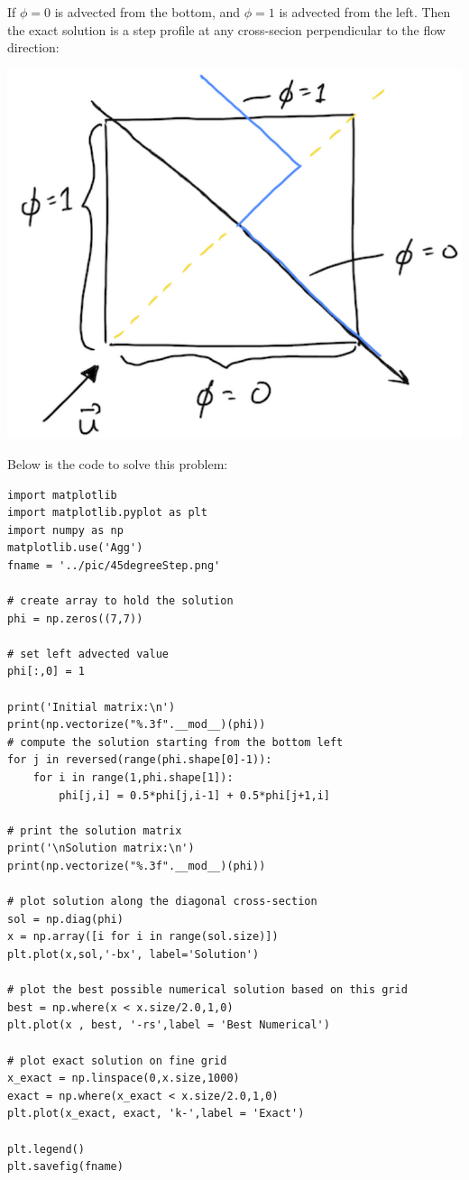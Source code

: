 \documentclass[11pt]{article}
\begin{document}
If \(\phi = 0\) is advected from the bottom, and \(\phi = 1\) is advected from the left. Then the exact
solution is a step profile at any cross-secion perpendicular to the flow direction:
\begin{center}
\includegraphics[scale=0.4]{../pic/stepProfile.png}
\end{center}

Below is the code to solve this problem:
\lstset{language=Python,label= ,caption= ,captionpos=b,numbers=none,style=mystyle}
\begin{lstlisting}
import matplotlib
import matplotlib.pyplot as plt
import numpy as np
matplotlib.use('Agg')
fname = '../pic/45degreeStep.png'

# create array to hold the solution
phi = np.zeros((7,7))

# set left advected value
phi[:,0] = 1

print('Initial matrix:\n')
print(np.vectorize("%.3f".__mod__)(phi))
# compute the solution starting from the bottom left
for j in reversed(range(phi.shape[0]-1)):
    for i in range(1,phi.shape[1]):
        phi[j,i] = 0.5*phi[j,i-1] + 0.5*phi[j+1,i]

# print the solution matrix
print('\nSolution matrix:\n')
print(np.vectorize("%.3f".__mod__)(phi))

# plot solution along the diagonal cross-section
sol = np.diag(phi)
x = np.array([i for i in range(sol.size)])
plt.plot(x,sol,'-bx', label='Solution')

# plot the best possible numerical solution based on this grid
best = np.where(x < x.size/2.0,1,0)
plt.plot(x , best, '-rs',label = 'Best Numerical')

# plot exact solution on fine grid
x_exact = np.linspace(0,x.size,1000)
exact = np.where(x_exact < x.size/2.0,1,0)
plt.plot(x_exact, exact, 'k-',label = 'Exact')

plt.legend()
plt.savefig(fname)

\end{lstlisting}
\end{document}
